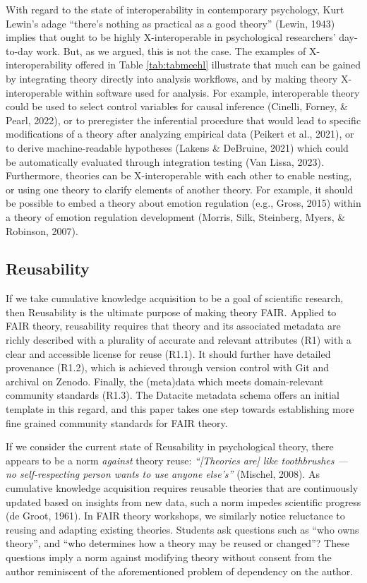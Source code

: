 \documentclass[
  man,floatsintext]{apa6}
\begin{document}
With regard to the state of interoperability in contemporary psychology,
Kurt Lewin's adage ``there's nothing as practical as a good theory'' (Lewin, 1943) implies that ought to be highly X-interoperable in psychological researchers' day-to-day work.
But, as we argued, this is not the case.
The examples of X-interoperability offered in Table \ref{tab:tabmeehl} illustrate that much can be gained by integrating theory directly into analysis workflows, and by making theory X-interoperable within software used for analysis.
For example, interoperable theory could be used
to select control variables for causal inference (Cinelli, Forney, \& Pearl, 2022),
or to preregister the inferential procedure that would lead to specific modifications of a theory after analyzing empirical data (Peikert et al., 2021),
or to derive machine-readable hypotheses (Lakens \& DeBruine, 2021) which could be automatically evaluated through integration testing (Van Lissa, 2023).
Furthermore, theories can be X-interoperable with each other to enable nesting, or using one theory to clarify elements of another theory.
For example, it should be possible to embed a theory about emotion regulation (e.g., Gross, 2015) within a theory of emotion regulation development (Morris, Silk, Steinberg, Myers, \& Robinson, 2007).

\subsection{Reusability}\label{reusability}

If we take cumulative knowledge acquisition to be a goal of scientific research, then Reusability is the ultimate purpose of making theory FAIR.
Applied to FAIR theory, reusability requires that theory and its associated metadata are richly described with a plurality of accurate and relevant attributes (R1) with a clear and accessible license for reuse (R1.1).
It should further have detailed provenance (R1.2),
which is achieved through version control with Git and archival on Zenodo.
Finally, the (meta)data which meets domain-relevant community standards (R1.3).
The Datacite metadata schema offers an initial template in this regard,
and this paper takes one step towards establishing more fine grained community standards for FAIR theory.

If we consider the current state of Reusability in psychological theory, there appears to be a norm \emph{against} theory reuse:
\emph{``{[}Theories are{]} like toothbrushes --- no self-respecting person wants to use anyone else's''} (Mischel, 2008).
As cumulative knowledge acquisition requires reusable theories that are continuously updated based on insights from new data, such a norm impedes scientific progress (de Groot, 1961).
In FAIR theory workshops, we similarly notice reluctance to reusing and adapting existing theories.
Students ask questions such as ``who owns theory'',
and ``who determines how a theory may be reused or changed''?
These questions imply a norm against modifying theory without consent from the author reminiscent of the aforementioned problem of dependency on the author.
\end{document}
